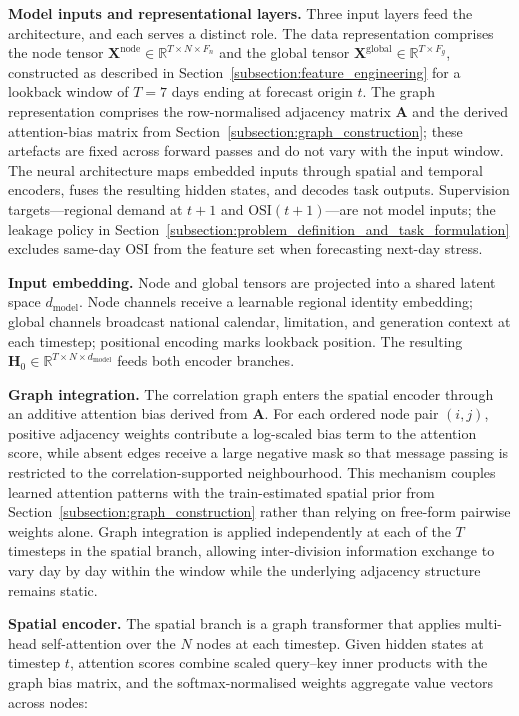 \textbf{Model inputs and representational layers.} Three input layers feed the architecture, and each serves a distinct role. The data representation comprises the node tensor \(\mathbf{X}^{\mathrm{node}} \in \mathbb{R}^{T \times N \times F_n}\) and the global tensor \(\mathbf{X}^{\mathrm{global}} \in \mathbb{R}^{T \times F_g}\), constructed as described in Section~\ref{subsection:feature_engineering} for a lookback window of \(T = 7\) days ending at forecast origin \(t\). The graph representation comprises the row-normalised adjacency matrix \(\mathbf{A}\) and the derived attention-bias matrix from Section~\ref{subsection:graph_construction}; these artefacts are fixed across forward passes and do not vary with the input window. The neural architecture maps embedded inputs through spatial and temporal encoders, fuses the resulting hidden states, and decodes task outputs. Supervision targets---regional demand at \(t+1\) and \(\mathrm{OSI}(t+1)\)---are not model inputs; the leakage policy in Section~\ref{subsection:problem_definition_and_task_formulation} excludes same-day OSI from the feature set when forecasting next-day stress.

\textbf{Input embedding.} Node and global tensors are projected into a shared latent space \(d_{\mathrm{model}}\). Node channels receive a learnable regional identity embedding; global channels broadcast national calendar, limitation, and generation context at each timestep; positional encoding marks lookback position. The resulting \(\mathbf{H}_0 \in \mathbb{R}^{T \times N \times d_{\mathrm{model}}}\) feeds both encoder branches.

\textbf{Graph integration.} The correlation graph enters the spatial encoder through an additive attention bias derived from \(\mathbf{A}\). For each ordered node pair \((i,j)\), positive adjacency weights contribute a log-scaled bias term to the attention score, while absent edges receive a large negative mask so that message passing is restricted to the correlation-supported neighbourhood. This mechanism couples learned attention patterns with the train-estimated spatial prior from Section~\ref{subsection:graph_construction} rather than relying on free-form pairwise weights alone. Graph integration is applied independently at each of the \(T\) timesteps in the spatial branch, allowing inter-division information exchange to vary day by day within the window while the underlying adjacency structure remains static.

\textbf{Spatial encoder.} The spatial branch is a graph transformer \cite{Vaswani2017Attention,Kipf2017GCN} that applies multi-head self-attention over the \(N\) nodes at each timestep. Given hidden states at timestep \(t\), attention scores combine scaled query--key inner products with the graph bias matrix, and the softmax-normalised weights aggregate value vectors across nodes:

